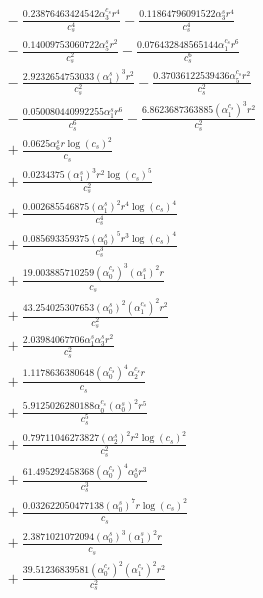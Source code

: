 \documentclass[10pt]{article}
\begin{document}
\begin{align*}
&{}  - \frac{0.23876463424542 \alpha_{3}^{c_s} r^{4}}{c_{s}^{4}} - \frac{0.11864796091522 \alpha_{3}^s r^{4}}{c_{s}^{4}} \\
&{}  - \frac{0.14009753060722 \alpha_{5}^s r^{2}}{c_{s}^{2}} - \frac{0.076432848565144 \alpha_{1}^{c_s} r^{6}}{c_{s}^{6}} \\
&{}  - \frac{2.9232654753033 \left(\alpha_{1}^s\right)^{3} r^{2}}{c_{s}^{2}} - \frac{0.37036122539436 \alpha_{5}^{c_s} r^{2}}{c_{s}^{2}} \\
&{}  - \frac{0.050080440992255 \alpha_{1}^s r^{6}}{c_{s}^{6}} - \frac{6.8623687363885 \left(\alpha_{1}^{c_s}\right)^{3} r^{2}}{c_{s}^{2}} \\
&{}  + \frac{0.0625 \alpha_{6}^s r \log{\left(c_{s} \right)}^{2}}{c_{s}} \\
&{}  + \frac{0.0234375 \left(\alpha_{1}^s\right)^{3} r^{2} \log{\left(c_{s} \right)}^{5}}{c_{s}^{2}} \\
&{}  + \frac{0.002685546875 \left(\alpha_{1}^s\right)^{2} r^{4} \log{\left(c_{s} \right)}^{4}}{c_{s}^{4}} \\
&{}  + \frac{0.085693359375 \left(\alpha_{0}^s\right)^{5} r^{3} \log{\left(c_{s} \right)}^{4}}{c_{s}^{3}} \\
&{}  + \frac{19.003885710259 \left(\alpha_{0}^{c_s}\right)^{3} \left(\alpha_{1}^s\right)^{2} r}{c_{s}} \\
&{}  + \frac{43.254025307653 \left(\alpha_{0}^s\right)^{2} \left(\alpha_{1}^{c_s}\right)^{2} r^{2}}{c_{s}^{2}} \\
&{}  + \frac{2.03984067706 \alpha_{1}^s \alpha_{3}^s r^{2}}{c_{s}^{2}} \\
&{}  + \frac{1.1178636380648 \left(\alpha_{0}^{c_s}\right)^{4} \alpha_{2}^{c_s} r}{c_{s}} \\
&{}  + \frac{5.9125026280188 \alpha_{0}^{c_s} \left(\alpha_{0}^s\right)^{2} r^{5}}{c_{s}^{5}} \\
&{}  + \frac{0.79711046273827 \left(\alpha_{2}^s\right)^{2} r^{2} \log{\left(c_{s} \right)}^{2}}{c_{s}^{2}} \\
&{}  + \frac{61.495292458368 \left(\alpha_{0}^{c_s}\right)^{4} \alpha_{0}^s r^{3}}{c_{s}^{3}} \\
&{}  + \frac{0.032622050477138 \left(\alpha_{0}^s\right)^{7} r \log{\left(c_{s} \right)}^{2}}{c_{s}} \\
&{}  + \frac{2.3871021072094 \left(\alpha_{0}^s\right)^{3} \left(\alpha_{1}^s\right)^{2} r}{c_{s}} \\
&{}  + \frac{39.51236839581 \left(\alpha_{0}^{c_s}\right)^{2} \left(\alpha_{1}^{c_s}\right)^{2} r^{2}}{c_{s}^{2}} \\

\end{align*}
\end{document}
